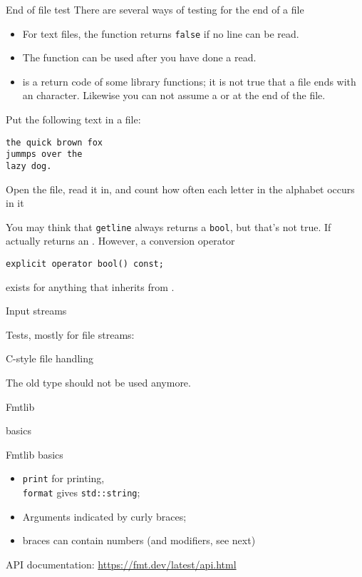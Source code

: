 \begin{block}{End of file test}
  There are several ways of testing for the end of a file
  \begin{itemize}
  \item For text files, the  function returns
    \lstinline{false} if no line can be read.
  \item The  function can be used after you have done
    a read.
  \item {} is a return code of some library
    functions; it is not true that a file ends with an 
    character.
    Likewise you can not assume a
     or  at the end of the file.
  \end{itemize}
\end{block}

\begin{exercise}
  \label{ex:foxcount}
  Put the following text in a file:
\begin{verbatim}
the quick brown fox
jummps over the
lazy dog.
\end{verbatim}
  Open the file, read it in, and count how often each letter in the
  alphabet occurs in it
\end{exercise}

\begin{advanced}
  You may think that \lstinline{getline} always returns a \lstinline{bool}, but that's
  not true. If actually returns an . However, a conversion operator
\begin{verbatim}
explicit operator bool() const;
\end{verbatim}
  exists for anything that inherits from .
\end{advanced}

 {Input streams}

Tests, mostly for file streams:  

 {C-style file handling}

The old  type should not be used anymore.

 {Fmtlib}
\label{sec:fmtlib}

 {basics}

\begin{block}{Fmtlib basics}
  \label{sl:fmtlib-basic}
  \begin{itemize}
  \item \lstinline{print} for printing,\\
    \lstinline{format} gives \lstinline+std::string+;
  \item Arguments indicated by curly braces;
  \item braces can contain numbers (and modifiers, see next)
  \end{itemize}
  API documentation:
  \url{https://fmt.dev/latest/api.html}
\end{block}

